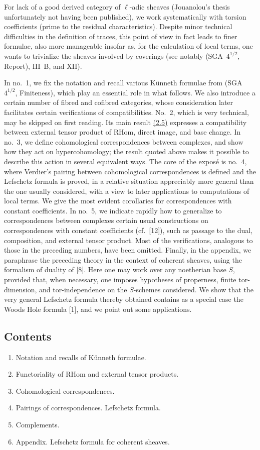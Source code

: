 \documentclass[11pt]{article}
\providecommand{\RHom}{\mathrm{RHom}}
\providecommand{\RHom}{\mathrm{RHom}}
\providecommand{\RHom}{\mathrm R\mathcal{H}om}
\providecommand{\RHom}{\mathrm{RHom}}
\begin{document}
For lack of a good derived category of $\ell$-adic sheaves (Jouanolou's thesis unfortunately not having been published), we work systematically with torsion coefficients (prime to the residual characteristics). Despite minor technical difficulties in the definition of traces, this point of view in fact leads to finer formulae, also more manageable insofar as, for the calculation of local terms, one wants to trivialize the sheaves involved by coverings (see notably (SGA~$4^{1/2}$, Report), III~B, and XII).

In no.~1, we fix the notation and recall various Künneth formulae from (SGA~$4^{1/2}$, Finiteness), which play an essential role in what follows. We also introduce a certain number of fibred and cofibred categories, whose consideration later facilitates certain verifications of compatibilities. No.~2, which is very technical, may be skipped on first reading. Its main result \hyperref[sga5:III:proposition:2.5]{(2.5)} expresses a compatibility between external tensor product of $\RHom$, direct image, and base change. In no.~3, we define cohomological correspondences between complexes, and show how they act on hypercohomology; the result quoted above makes it possible to describe this action in several equivalent ways. The core of the exposé is no.~4, where Verdier's pairing between cohomological correspondences is defined and the Lefschetz formula is proved, in a relative situation appreciably more general than the one usually considered, with a view to later applications to computations of local terms. We give the most evident corollaries for correspondences with constant coefficients. In no.~5, we indicate rapidly how to generalize to correspondences between complexes certain usual constructions on correspondences with constant coefficients (cf.~[12]), such as passage to the dual, composition, and external tensor product. Most of the verifications, analogous to those in the preceding numbers, have been omitted. Finally, in the appendix, we paraphrase the preceding theory in the context of coherent sheaves, using the formalism of duality of [8]. Here one may work over any noetherian base $S$, provided that, when necessary, one imposes hypotheses of properness, finite tor-dimension, and tor-independence on the $S$-schemes considered. We show that the very general Lefschetz formula thereby obtained contains as a special case the Woods Hole formula [1], and we point out some applications.

\subsection*{Contents}
\begin{enumerate}[label=\arabic*.]
\item Notation and recalls of Künneth formulae.
\item Functoriality of $\RHom$ and external tensor products.
\item Cohomological correspondences.
\item Pairings of correspondences. Lefschetz formula.
\item Complements.
\item Appendix. Lefschetz formula for coherent sheaves.
\end{enumerate}
\end{document}
